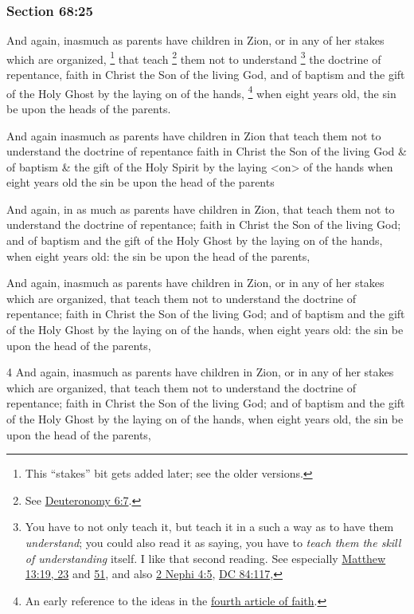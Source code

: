	\subsubsection{Section 68:25} %
		\label{DC68-25}

		And again, inasmuch as parents have children in Zion, or in any of her stakes which are organized,%
			\footnote{%
				This ``stakes'' bit gets added later; see the older versions.
				}
		that teach%
			\footnote{%
				See \hyperref[DEUTERONOMY-6-7]{Deuteronomy 6:7}.
				}
		them not to understand%
			\footnote{%
				You have to not only teach it, but teach it in a such a way as to have them \textit{understand}; you could also read it as saying, you have to \textit{teach them the skill of understanding} itself. I like that second reading. See especially \hyperref[MATTHEW-13-19]{Matthew 13:19, 23} and \hyperref[MATTHEW-13-51]{51}, and also \hyperref[2NEPHI-4-5]{2 Nephi 4:5}, \hyperref[DC84-117]{DC 84:117},
				}
		the doctrine of repentance, faith in Christ the Son of the living God, and of baptism and the gift of the Holy Ghost by the laying on of the hands,%
			\footnote{%
				An early reference to the ideas in the \hyperref[ARTICLESOFFAITH-4]{fourth article of faith}.
				}
		when eight years old, the sin be upon the heads of the parents.

		\begin{framed}
		\scriptsize
			\begin{compactdesc}
				\item[JSP] And again inasmuch as parents have children in Zion that teach them not to understand the doctrine of repentance faith in Christ the Son of the living God \& of baptism \& the gift of the Holy Spirit by the laying <on> of the hands when eight years old the sin be upon the head of the parents
				\item[EMS] And again, in as much as parents have children in Zion, that teach them not to understand the doctrine of repentance; faith in Christ the Son of the living God; and of baptism and the gift of the Holy Ghost by the laying on of the hands, when eight years old: the sin be upon the head of the parents,
				\item[EMS-R] And again, inasmuch as parents have children in Zion, or in any of her stakes which are organized, that teach them not to understand the doctrine of repentance; faith in Christ the Son of the living God; and of baptism and the gift of the Holy Ghost by the laying on of the hands, when eight years old: the sin be upon the head of the parents,
				\item[DC 1835] 4 And again, inasmuch as parents have children in Zion, or in any of her stakes which are organized, that teach them not to understand the doctrine of repentance; faith in Christ the Son of the living God; and of baptism and the gift of the Holy Ghost by the laying on of the hands, when eight years old, the sin be upon the head of the parents,
			\end{compactdesc}
		\end{framed}

